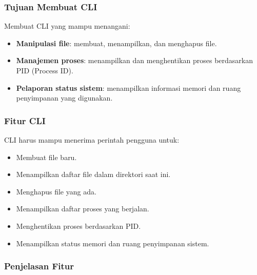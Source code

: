 \documentclass[12pt]{article}
\begin{document}
\subsubsection{Tujuan Membuat CLI }

Membuat CLI yang mampu menangani:

\begin{itemize}
    \item \textbf{Manipulasi file}: membuat, menampilkan, dan menghapus file.
    \item \textbf{Manajemen proses}: menampilkan dan menghentikan proses berdasarkan PID (Process ID).
    \item \textbf{Pelaporan status sistem}: menampilkan informasi memori dan ruang penyimpanan yang digunakan.
\end{itemize}

\subsubsection{Fitur CLI}

CLI harus mampu menerima perintah pengguna untuk:

\begin{itemize}
    \item Membuat file baru.
    \item Menampilkan daftar file dalam direktori saat ini.
    \item Menghapus file yang ada.
    \item Menampilkan daftar proses yang berjalan.
    \item Menghentikan proses berdasarkan PID.
    \item Menampilkan status memori dan ruang penyimpanan sistem.
\end{itemize}

\subsubsection{Penjelasan Fitur}
\end{document}
